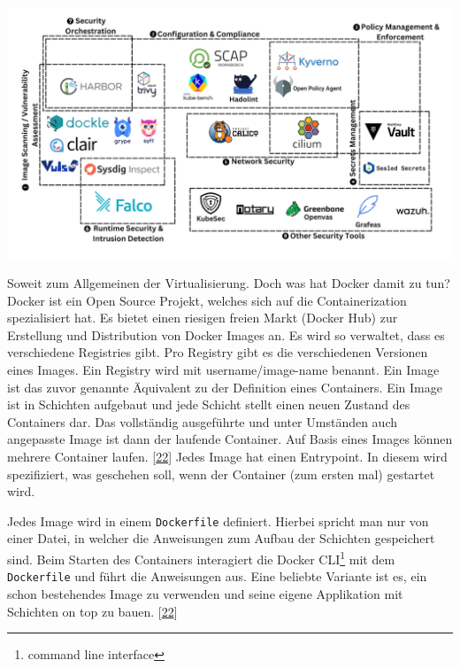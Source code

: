 \documentclass[
    headings=optiontotocandhead,%
    twoside,
    numbers=noenddot,%
    12pt, %
    titlepage, %
    parskip=full, %
    listof=leveldown, 
    numbers=noenddot, %
    a4paper,DIV=14,
    BCOR=15mm,
]{scrbook}
\newcommand{\passthrough}[1]{#1}
\let\origfigure=\figure
\let\endorigfigure=\endfigure
\renewenvironment{figure}[1][]{%
   \origfigure[H]
}{%
   \endorigfigure
}
\begin{document}
\begin{figure}
\centering
\includegraphics[width=1\textwidth,height=\textheight]{img/Schrempf/Container-Security-Tools.png}
\caption{Übersicht von Container Security Tools
{[}\protect\hyperlink{ref-docker-security}{23}{]}}
\end{figure}

Soweit zum Allgemeinen der Virtualisierung. Doch was hat Docker damit zu
tun? Docker ist ein Open Source Projekt, welches sich auf die
Containerization spezialisiert hat. Es bietet einen riesigen freien
Markt (Docker Hub) zur Erstellung und Distribution von Docker Images an.
Es wird so verwaltet, dass es verschiedene Registries gibt. Pro Registry
gibt es die verschiedenen Versionen eines Images. Ein Registry wird mit
username/image-name benannt. Ein Image ist das zuvor genannte Äquivalent
zu der Definition eines Containers. Ein Image ist in Schichten aufgebaut
und jede Schicht stellt einen neuen Zustand des Containers dar. Das
vollständig ausgeführte und unter Umständen auch angepasste Image ist
dann der laufende Container. Auf Basis eines Images können mehrere
Container laufen. {[}\protect\hyperlink{ref-ibm-docker}{22}{]} Jedes
Image hat einen Entrypoint. In diesem wird spezifiziert, was geschehen
soll, wenn der Container (zum ersten mal) gestartet wird.

Jedes Image wird in einem \passthrough{\lstinline!Dockerfile!}
definiert. Hierbei spricht man nur von einer Datei, in welcher die
Anweisungen zum Aufbau der Schichten gespeichert sind. Beim Starten des
Containers interagiert die Docker CLI\footnote{command line interface}
mit dem \passthrough{\lstinline!Dockerfile!} und führt die Anweisungen
aus. Eine beliebte Variante ist es, ein schon bestehendes Image zu
verwenden und seine eigene Applikation mit Schichten on top zu bauen.
{[}\protect\hyperlink{ref-ibm-docker}{22}{]}
\end{document}
